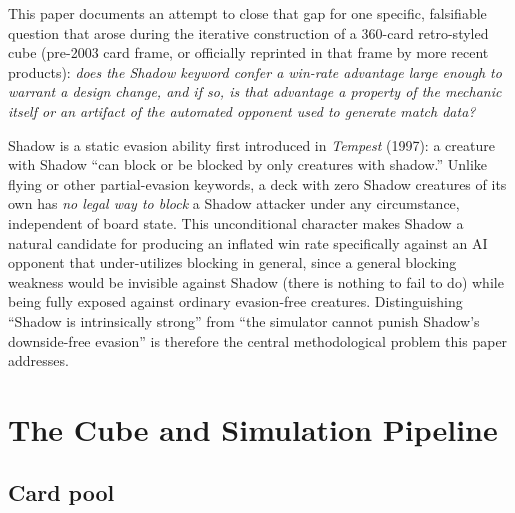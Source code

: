 \documentclass[11pt]{article}
\begin{document}
This paper documents an attempt to close that gap for one specific, falsifiable
question that arose during the iterative construction of a 360-card retro-styled cube
(pre-2003 card frame, or officially reprinted in that frame by more recent products):
\emph{does the Shadow keyword confer a win-rate advantage large enough to warrant a
design change, and if so, is that advantage a property of the mechanic itself or an
artifact of the automated opponent used to generate match data?}

Shadow is a static evasion ability first introduced in \emph{Tempest} (1997): a
creature with Shadow ``can block or be blocked by only creatures with shadow.''
Unlike flying or other partial-evasion keywords, a deck with zero Shadow creatures of
its own has \emph{no legal way to block} a Shadow attacker under any circumstance,
independent of board state. This unconditional character makes Shadow a natural
candidate for producing an inflated win rate specifically against an AI opponent that
under-utilizes blocking in general, since a general blocking weakness would be
invisible against Shadow (there is nothing to fail to do) while being fully exposed
against ordinary evasion-free creatures. Distinguishing ``Shadow is intrinsically
strong'' from ``the simulator cannot punish Shadow's downside-free evasion'' is
therefore the central methodological problem this paper addresses.

\section{The Cube and Simulation Pipeline}

\subsection{Card pool}
\end{document}
